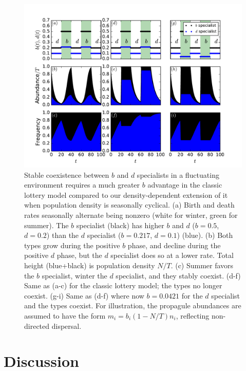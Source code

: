 \documentclass[11pt]{article}
\begin{document}
\begin{figure}
\centering
\includegraphics[scale=0.7]{fluctuatingselection.pdf}
\caption{\label{fig:fluctuatingselection} Stable coexistence between $b$ and $d$ specialists in a fluctuating environment requires a much greater $b$ advantage in the classic lottery model compared to our density-dependent extension of it when population density is seasonally cyclical. (a) Birth and death rates seasonally alternate being nonzero (white for winter, green for summer). The $b$ specialist (black) has higher $b$ and $d$ ($b=0.5$, $d=0.2$) than the $d$ specialist ($b=0.217$, $d=0.1$) (blue). (b) Both types grow during the positive $b$ phase, and decline during the positive $d$ phase, but the $d$ specialist does so at a lower rate. Total height (blue+black) is population density $N/T$. (c) Summer favors the $b$ specialist, winter the $d$ specialist, and they stably coexist. (d-f) Same as (a-c) for the classic lottery model; the types no longer coexist. (g-i) Same as (d-f) where now $b = 0.0421$ for the $d$ specialist and the types coexist. For illustration, the propagule abundances are assumed to have the form $m_i=b_i(1-N/T)n_i$, reflecting non-directed dispersal.} 
\end{figure}

\section*{Discussion}
\end{document}

